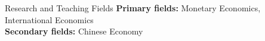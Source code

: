 \documentclass{resume_liang} %
\begin{document}

\begin{rSection}{Research and Teaching Fields}
{\bf Primary fields:} Monetary Economics, International Economics \vspace{0.1cm}\\ 
{\bf Secondary fields:} Chinese Economy  \\
\end{rSection}
\bigskip \bigskip






\end{document}
